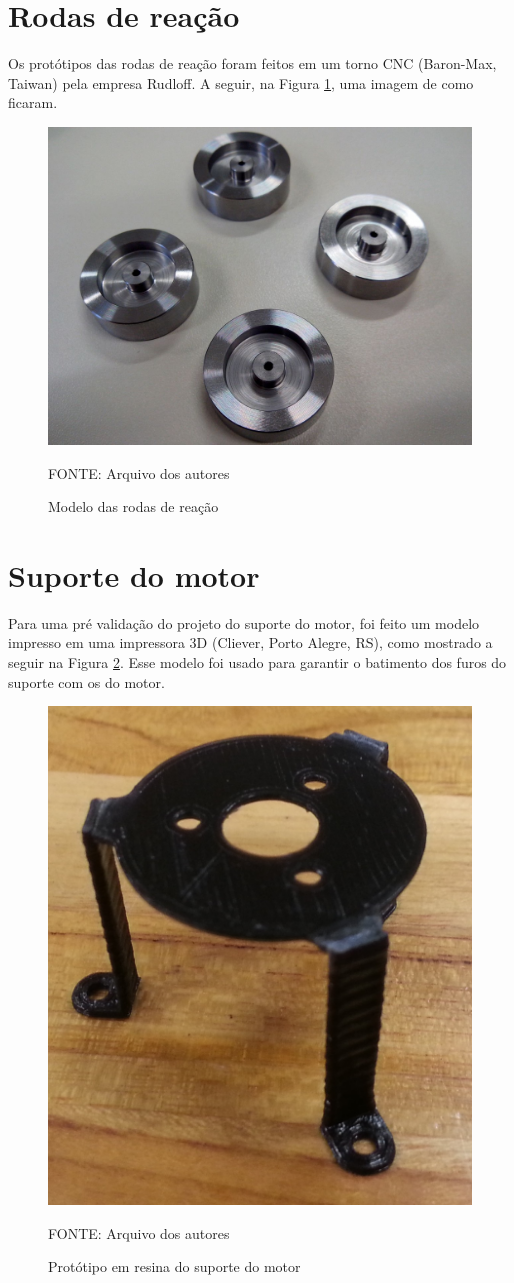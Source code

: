 \documentclass[
	12pt,				%
	openany,			%
	twoside,			%
	a4paper,			%
	english,			%
	french,				%
	spanish,			%
	brazil,				%
	oldfontcommands
	]{abntex2}
\begin{document}
\section{Rodas de reação}

Os protótipos das rodas de reação foram feitos em um torno CNC (Baron-Max, Taiwan) pela empresa Rudloff. A seguir, na Figura \ref{fig:ProtoRW}, uma imagem de como ficaram.

\begin{figure}[th]
	\caption{Modelo das rodas de reação}
	\centering
	\includegraphics[width=0.7\linewidth]{./figs/Proto_RW}
	
	\begin{small}
		FONTE: Arquivo dos autores
	\end{small}
	\label{fig:ProtoRW}
\end{figure}

\section{Suporte do motor}

Para uma pré validação do projeto do suporte do motor, foi feito um modelo impresso em uma impressora 3D (Cliever, Porto Alegre, RS), como mostrado a seguir na Figura \ref{fig:ProtoMSP}. Esse modelo foi usado para garantir o batimento dos furos do suporte com os do motor.

\begin{figure}[th]
	\caption{Protótipo em resina do suporte do motor}
	\centering
	\includegraphics[width=0.5\linewidth]{./figs/Proto_3D}
	
	\begin{small}
		FONTE: Arquivo dos autores
	\end{small}
	\label{fig:ProtoMSP}
\end{figure}
\end{document}
